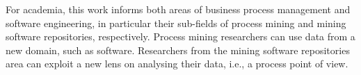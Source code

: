 For academia, this work informs both areas of business process management and software engineering, in particular their sub-fields of process mining and mining software repositories, respectively. Process mining researchers can use data from a new domain, such as software. Researchers from the mining software repositories area can exploit a new lens on analysing their data, i.e., a process point of view. 

